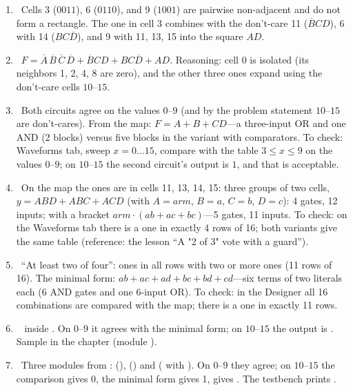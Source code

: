 \begin{enumerate}
  \item {}~Cells 3 ($0011$), 6 ($0110$), and 9 ($1001$) are pairwise non-adjacent and do not form a rectangle. The one in cell 3 combines with the don't-care 11 ($\overline{B}CD$), 6 with 14 ($BC\overline{D}$), and 9 with 11, 13, 15 into the square $AD$.
  \item {}~$F=\overline{A}\,\overline{B}\,\overline{C}\,\overline{D}+\overline{B}CD+BC\overline{D}+AD$. Reasoning: cell 0 is isolated (its neighbors 1, 2, 4, 8 are zero), and the other three ones expand using the don't-care cells $10$--$15$.
  \item {}~Both circuits agree on the values $0$--$9$ (and by the problem statement $10$--$15$ are don't-cares). From the map: $F=A+B+CD$---a three-input OR and one AND (2 blocks) versus five blocks in the variant with comparators. To check: Waveforms tab, sweep $x=0\ldots15$, compare with the table $3\le x\le9$ on the values $0$--$9$; on $10$--$15$ the second circuit's output is $1$, and that is acceptable.
  \item {}~On the map the ones are in cells 11, 13, 14, 15: three groups of two cells, $y=ABD+ABC+ACD$ (with $A=arm$, $B=a$, $C=b$, $D=c$): 4 gates, 12 inputs; with a bracket $arm\cdot(ab+ac+bc)$---5 gates, 11 inputs. To check: on the Waveforms tab there is a one in exactly 4 rows of 16; both variants give the same table (reference: the lesson ``A "2 of 3" vote with a guard'').
  \item {}~``At least two of four'': ones in all rows with two or more ones (11 rows of 16). The minimal form: $ab+ac+ad+bc+bd+cd$---six terms of two literals each (6 AND gates and one 6-input OR). To check: in the Designer all 16 combinations are compared with the map; there is a one in exactly 11 rows.
  \item {}~ inside . On $0$--$9$ it agrees with the minimal form; on $10$--$15$ the output is . Sample in the chapter (module ).
  \item {}~Three modules from :  (),  () and  ( with ). On $0$--$9$ they agree; on $10$--$15$ the comparison gives 0, the minimal form gives 1,  gives . The testbench  prints .
\end{enumerate}

